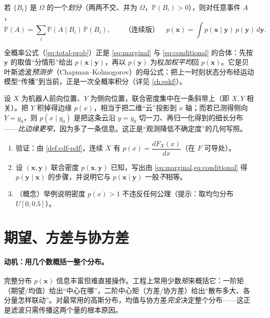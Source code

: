 \begin{definition}[全概率公式]\label{def:total-prob}
若 $\{B_i\}$ 是 $\Omega$ 的一个\emph{划分}（两两不交、并为 $\Omega$，$\mathbb{P}(B_i)>0$），则对任意事件 $A$，
\begin{equation}
  \mathbb{P}(A)=\sum_i\mathbb{P}(A\mid B_i)\,\mathbb{P}(B_i),
  \qquad\text{（连续版）}\quad p(\mathbf{x})=\int p(\mathbf{x}\mid\mathbf{y})\,p(\mathbf{y})\,d\mathbf{y}.
  \label{eq:total-prob}
\end{equation}
\end{definition}
\noindent 全概率公式（\cref{eq:total-prob}）正是 \cref{eq:marginal} 与 \cref{eq:conditional} 的合体：先按 $\mathbf{y}$ 的取值“分情形”给出 $p(\mathbf{x}\mid\mathbf{y})$，再以 $p(\mathbf{y})$ 为权\emph{加权平均}回 $p(\mathbf{x})$。它是贝叶斯滤波\emph{预测步}（Chapman--Kolmogorov）的母公式：把上一时刻状态分布经运动模型“传播”到当前，正是一次全概率积分（详见 \cref{ch:eskf}）。

\begin{example}[一维到二维的直觉]\label{ex:joint-marginal}
设 $X$ 为机器人前向位置、$Y$ 为侧向位置，联合密度集中在一条斜带上（即 $X,Y$ 相关）。把 $Y$ 积掉得边缘 $p(x)$，相当于把二维“云”投影到 $x$ 轴；而若已测得侧向 $Y=y_0$，则 $p(x\mid y_0)$ 是把这条云沿 $y=y_0$ 切一刀、再归一化得到的细长分布——\emph{比边缘更窄}，因为多了一条信息。这正是“观测降低不确定度”的几何写照。
\end{example}

\begin{practice}
\begin{enumerate}
  \item 验证：由 \cref{def:cdf-pdf}，连续 $X$ 有 $p(x)=\dfrac{dF_X(x)}{dx}$（在 $F$ 可导处）。
  \item 设 $(\mathbf{x},\mathbf{y})$ 联合密度 $p(\mathbf{x},\mathbf{y})$ 已知，写出由 \cref{eq:marginal,eq:conditional} 得 $p(\mathbf{y}\mid\mathbf{x})$ 的步骤，并说明它与 $p(\mathbf{x}\mid\mathbf{y})$ 一般\emph{不}相等。
  \item （概念）举例说明密度 $p(x)>1$ 不违反任何公理（提示：取均匀分布 $U[0,0.5]$）。
\end{enumerate}
\end{practice}

\section{期望、方差与协方差}
\label{sec:prob-moments}

\paragraph{动机：用几个数概括一整个分布。}
完整分布 $p(\mathbf{x})$ 信息丰富但难直接操作。工程上常用少数\emph{矩}来概括它：一阶矩（期望/均值）给出“中心在哪”，二阶中心矩（方差/协方差）给出“散布多大、各分量怎样联动”。对最常用的高斯分布，均值与协方差\emph{完全}决定整个分布——这正是滤波只需传播这两个量的根本原因。


